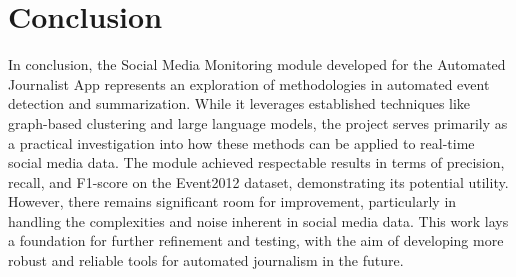 \section{Conclusion}

In conclusion, the Social Media Monitoring module developed for the Automated Journalist App represents an exploration of methodologies in automated event detection and summarization. While it leverages established techniques like graph-based clustering and large language models, the project serves primarily as a practical investigation into how these methods can be applied to real-time social media data. The module achieved respectable results in terms of precision, recall, and F1-score on the Event2012 dataset, demonstrating its potential utility. However, there remains significant room for improvement, particularly in handling the complexities and noise inherent in social media data. This work lays a foundation for further refinement and testing, with the aim of developing more robust and reliable tools for automated journalism in the future.
